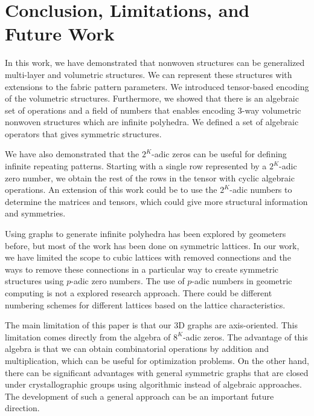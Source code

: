 \documentclass[times,twocolumn,final]{elsarticle}
\begin{document}
\section{Conclusion, Limitations, and Future Work}

In this work, we have demonstrated that nonwoven structures can be generalized multi-layer and volumetric structures. We can represent these structures with extensions to the fabric pattern parameters. We introduced tensor-based encoding of the volumetric structures. Furthermore, we showed that there is an algebraic set of operations and a field of numbers that enables encoding 3-way volumetric nonwoven structures which are infinite polyhedra. We defined a set of algebraic operators that gives symmetric structures.

We have also demonstrated that the $2^K$-adic zeros can be useful for defining infinite repeating patterns. Starting with a single row represented by a $2^K$-adic zero number, we obtain the rest of the rows in the tensor with cyclic algebraic operations. An extension of this work could be to use the $2^K$-adic numbers to determine the matrices and tensors, which could give more structural information and symmetries.

Using graphs to generate infinite polyhedra has been explored by geometers before, but most of the work has been done on symmetric lattices. In our work, we have limited the scope to cubic lattices with removed connections and the ways to remove these connections in a particular way to create symmetric structures using $p$-adic zero numbers. The use of $p$-adic numbers in geometric computing is not a explored research approach. There could be different numbering schemes for different lattices based on the lattice characteristics.

The main limitation of this paper is that our 3D graphs are axis-oriented. This limitation comes directly from the algebra of $8^K$-adic zeros. The advantage of this algebra is that we can obtain combinatorial operations by addition and multiplication, which can be useful for optimization problems. On the other hand, there can be significant advantages with general symmetric graphs that are closed under crystallographic groups using algorithmic instead of algebraic approaches. The development of such a general approach can be an important future direction. 
\end{document}
